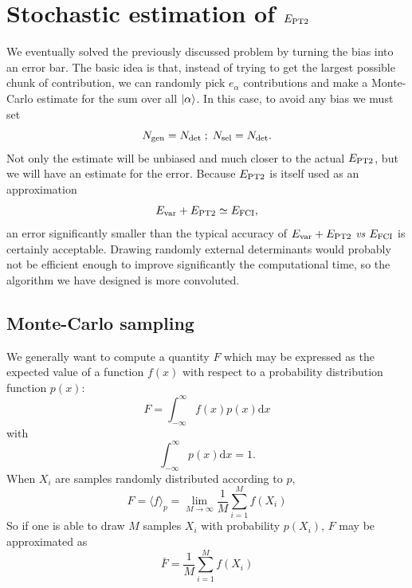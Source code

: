 \documentclass[./thesis.tex]{subfiles}
\begin{document}
\section{Stochastic estimation of $E_\text{PT2}$}

We eventually solved the previously discussed problem by turning the bias into an error bar. The basic idea is that, instead of trying to get the largest possible chunk of contribution, we can randomly pick $e_\alpha$ contributions and make a Monte-Carlo estimate for the sum over all $\ket \alpha$. In this case, to avoid any bias we must set
\begin{equation}
{N_\text{gen}} = {N_\text{det}} \; ; \; {N_\text{sel}} = {N_\text{det}}.
\end{equation}
Not only the estimate will be unbiased and much closer to the actual $E_\text{PT2}$, but we will have an estimate for the error. Because $E_\text{PT2}$ is itself used as an approximation
\begin{equation}
E_\text{var} + E_\text{PT2} \simeq E_\text{FCI},
\end{equation}
an error significantly smaller than the typical accuracy of $E_\text{var} + E_\text{PT2}$ \textit{vs} $E_\text{FCI}$ is certainly acceptable.
Drawing randomly external determinants would probably not be efficient enough to improve significantly
the computational time, so the algorithm we have designed is more convoluted.


\subsection{Monte-Carlo sampling}

We generally want to compute a quantity $F$ which may be expressed as the expected value of a function $f(x)$ with respect to a probability distribution function $p(x)$:
\begin{equation}
F = \int_{-\infty}^\infty f(x) p(x) \text{d} x
\end{equation}
with 
\begin{equation}
\int_{-\infty}^\infty p(x) \text{d} x = 1.
\end{equation}
When $X_i$ are samples randomly distributed according to $p$, 
\begin{equation}
\label{eq:sum_mc}
F = \langle f \rangle_p =  \lim_{M\rightarrow \infty} \frac{1}{M} \sum_{i=1}^{M} f(X_i)
\end{equation}
So if one is able to draw $M$ samples $X_i$ with probability $p(X_i)$, $F$ may be approximated as
\begin{equation}
\bar{F} = \frac{1}{M} \sum_{i=1}^{M} f(X_i)
\end{equation}
\end{document}

